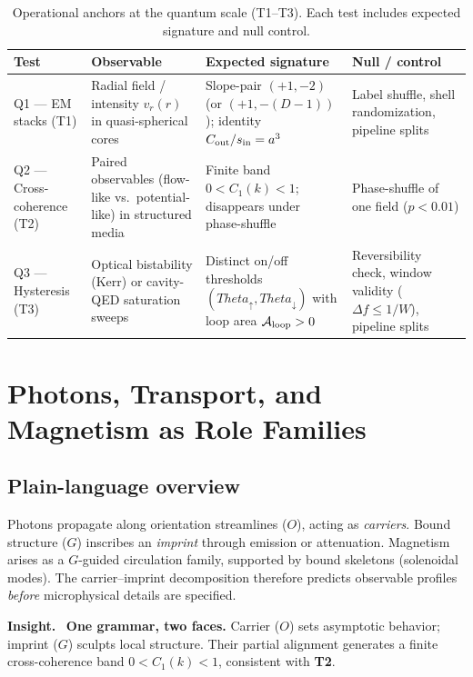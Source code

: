 \documentclass[12pt,a4paper,oneside]{scrreprt}
\def\Theta{Theta}%
\newenvironment{insight}{\par\vspace{0.5em}\noindent\textbf{Insight.}\ }{\par\vspace{0.5em}}
\begin{document}
\begin{table}[h]
\centering
\caption{Operational anchors at the quantum scale (T1–T3). Each test includes expected signature and null control.}
\begin{tabular}{p{2.2cm} p{3.5cm} p{3.5cm} p{3.5cm}}
\toprule
\textbf{Test} & \textbf{Observable} & \textbf{Expected signature} & \textbf{Null / control} \\
\midrule
Q1 — EM stacks (T1) & Radial field / intensity $v_r(r)$ in quasi-spherical cores & Slope-pair $(+1,-2)$ (or $(+1,-(D{-}1))$); identity $C_{\rm out}/s_{\rm in}=a^3$ & Label shuffle, shell randomization, pipeline splits \\
\addlinespace
Q2 — Cross-coherence (T2) & Paired observables (flow-like vs.\ potential-like) in structured media & Finite band $0 < C_1(k) < 1$; disappears under phase-shuffle & Phase-shuffle of one field ($p<0.01$) \\
\addlinespace
Q3 — Hysteresis (T3) & Optical bistability (Kerr) or cavity-QED saturation sweeps & Distinct on/off thresholds $(\Theta_\uparrow,\Theta_\downarrow)$ with loop area $\mathcal A_{\rm loop}>0$ & Reversibility check, window validity ($\Delta f \le 1/W$), pipeline splits \\
\bottomrule
\end{tabular}
\end{table}

\chapter{Photons, Transport, and Magnetism as Role Families}\label{ch:quanta-families}

\section*{Plain-language overview}

Photons propagate along orientation streamlines ($O$), acting as \emph{carriers}. 
Bound structure ($G$) inscribes an \emph{imprint} through emission or attenuation. 
Magnetism arises as a $G$-guided circulation family, supported by bound skeletons 
(solenoidal modes). 
The carrier–imprint decomposition therefore predicts observable profiles 
\emph{before} microphysical details are specified.

\begin{insight}
\textbf{One grammar, two faces.} 
Carrier ($O$) sets asymptotic behavior; 
imprint ($G$) sculpts local structure. 
Their partial alignment generates a finite cross-coherence band 
$0 < C_1(k) < 1$, consistent with \textbf{T2}.
\end{insight}
\end{document}
